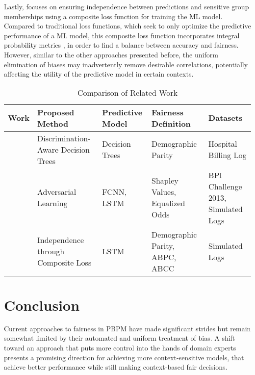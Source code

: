 Lastly, \cite{fairness_independence} focuses on ensuring independence
between predictions and sensitive group memberships using a composite loss function for training the ML model.
Compared to traditional loss functions, which seek to only optimize the predictive performance of a ML model,
this composite loss function incorporates integral probability metrics \cite{ipm},
in order to find a balance between accuracy and fairness.
However, similar to the other approaches presented before,
the uniform elimination of biases may inadvertently remove desirable correlations,
potentially affecting the utility of the predictive model in certain contexts.

\begin{table}[h!]
\centering
\footnotesize
\begin{tabular}{|>{\raggedright\arraybackslash}p{1.25cm}|>{\raggedright\arraybackslash}p{3.2cm}|>{\raggedright\arraybackslash}p{2cm}|>{\raggedright\arraybackslash}p{2.3cm}|>{\raggedright\arraybackslash}p{3cm}|}
\hline
\textbf{Work} & \textbf{Proposed Method} & \textbf{Predictive Model} & \textbf{Fairness Definition} & \textbf{Datasets} \\ \hline
\cite{fairness_foundation} & Discrimination-Aware Decision Trees & Decision Trees & Demographic Parity & Hospital Billing Log \\ \hline
\cite{fairness_adversarial} & Adversarial Learning & FCNN, LSTM & Shapley Values, Equalized Odds & BPI Challenge 2013, Simulated Logs \\ \hline
\cite{fairness_independence} & Independence through Composite Loss & LSTM & Demographic Parity, ABPC, ABCC & Simulated Logs \\ \hline
\end{tabular}
\caption{Comparison of Related Work}
\label{tab:related_work_comparison}
\end{table}

\section{Conclusion}
Current approaches to fairness in PBPM have made significant strides
but remain somewhat limited by their automated and uniform treatment of bias.
A shift toward an approach that puts more control into the hands of domain experts 
presents a promising direction for achieving more context-sensitive models,
that achieve better performance while still making context-based fair decisions.